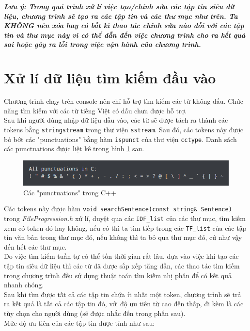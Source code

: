\documentclass[12pt,a4paper]{article}
\begin{document}
\textbf{\textit{Lưu ý: Trong quá trình xử lí việc tạo/chỉnh sửa các tập tin siêu dữ liệu, chương trình sẽ tạo ra các tập tin và các thư mục như trên. Ta KHÔNG nên xóa hay có bất kì thao tác chỉnh sửa nào đối với các tập tin và thư mục này vì có thể dẫn đến việc chương trình cho ra kết quả sai hoặc gây ra lỗi trong việc vận hành của chương trình.}}
\newpage
\section{Xử lí dữ liệu tìm kiếm đầu vào}
Chương trình chạy trên console nên chỉ hỗ trợ tìm kiếm các từ không dấu. Chức năng tìm kiếm với các từ tiếng Việt có dấu chưa được hỗ trợ.\\
Sau khi người dùng nhập dữ liệu đầu vào, các từ sẽ được tách ra thành các tokens bằng  \lstinline{stringstream} trong thư viện \lstinline{sstream}. Sau đó, các tokens này được bỏ bớt các "punctuations" bằng hàm \lstinline{ispunct} của thư viện \lstinline{cctype}. Danh sách các punctuations được liệt kê trong hình \ref{punc} sau. \cite{3}
\begin{figure}[H]
\begin{center}
\includegraphics[scale=1]{Fig13}
\end{center}
\caption{Các "punctuations" trong C++}
\label{punc}
\end{figure}
Các tokens này được hàm \lstinline{void searchSentence(const string& Sentence)} trong \textit{FileProgression.h} xử lí, duyệt qua các \lstinline{IDF_list} của các thư mục, tìm kiếm xem có token đó hay không, nếu có thì ta tìm tiếp trong các \lstinline{TF_list} của các tập tin văn bản trong thư mục đó, nếu không thì ta bỏ qua thư mục đó, cứ như vậy đến hết các thư mục.\\
Do việc tìm kiếm tuần tự có thể tốn thời gian rất lâu, dựa vào việc khi tạo các tập tin siêu dữ liệu thì các từ đã được sắp xếp tăng dần, các thao tác tìm kiếm trong chương trình đều sử dụng thuật toán tìm kiếm nhị phân để có kết quả nhanh chóng.\\
Sau khi tìm được tất cả các tập tin chứa ít nhất một token, chương trình sẽ trả ra kết quả là tất cả các tập tin đó, với độ ưu tiên từ cao đến thấp, đi kèm là các tùy chọn cho người dùng (sẽ được nhắc đến trong phấn sau).\\
Mức độ ưu tiên của các tập tin được tính như sau:
\end{document}
